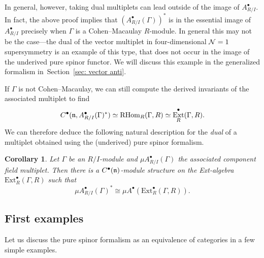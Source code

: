 \documentclass[pdftex]{sigma}
\numberwithin{equation}{section}
\newtheorem{cor}[thm]{Corollary}
\def\bu{\bullet}
\DeclareMathOperator{\Ext}{Ext}
\begin{document}
In general, however, taking dual multiplets can lead outside of the image of $A^\bullet_{R/I}$. In fact, the above proof implies that $(A^\bullet_{R/I}(\Gamma))^*$ is in the essential image of $A^\bullet_{R/I}$ precisely when $\Gamma$ is a Cohen--Macaulay $R$-module. In general this may not be the case---the dual of the vector multiplet in four-dimensional $\mathcal N=1$ supersymmetry is an example of this type, that does not occur in the image of the underived pure spinor functor. We will discuss this example in the generalized formalism in~Section~\ref{sec: vector anti}.

If $\Gamma$ is not Cohen--Macaulay, we can still compute the derived invariants of the associated multiplet to find
\begin{equation*}
C^\bullet(\fn, A^\bullet_{R/I}(\Gamma)^*) \simeq \mathrm{RHom}_R(\Gamma , R) \simeq \Ext^\bullet_R(\Gamma, R) .
\end{equation*}
We can therefore deduce the following natural description for the \emph{dual} of a multiplet obtained using the (underived) pure spinor formalism.

\begin{cor}
	Let $\Gamma$ be an $R/I$-module and $\mu A_{R/I}^\bu(\Gamma)$ the associated component field multiplet. Then there is a $C^\bullet(\mathfrak n)$-module structure on the Ext-algebra $\mathrm{Ext}^\bullet_R(\Gamma , R)$ such that
	\begin{equation*}
	\mu A_{R/I}^\bu(\Gamma)^* \cong \mu A^\bu(\mathrm{Ext}^\bullet_R(\Gamma , R)) .
	\end{equation*}
\end{cor}

\subsection{First examples}

Let us discuss the pure spinor formalism as an equivalence of categories in a few simple examples.
\end{document}
